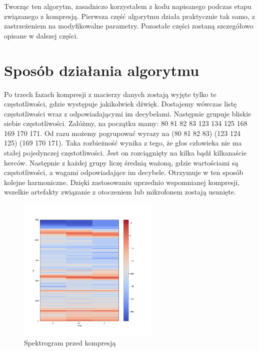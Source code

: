 \documentclass[a4paper,12pt]{extarticle}
\begin{document}
Tworząc ten algorytm, zasadniczo korzystałem z kodu napisanego podczas etapu związanego z kompresją. Pierwsza część algorytmu działa praktycznie tak samo, z zastrzeżeniem na modyfikowalne parametry. Pozostałe części zostaną szczegółowo opisane w dalszej części.

\section*{Sposób działania algorytmu}

Po trzech fazach kompresji \cite{report2} z macierzy danych zostają wyjęte tylko te częstotliwości, gdzie występuje jakikolwiek dźwięk. Dostajemy wówczas listę częstotliwości wraz z odpowiadającymi im decybelami. Następnie grupuje bliskie siebie częstotliwości. Załóżmy, na początku mamy: 80 81 82 83 123 134 125 168 169 170 171. Od razu możemy pogrupować wyrazy na (80 81 82 83) (123 124 125) (169 170 171). Taka rozbieżność wynika z tego, że głos człowieka nie ma stałej pojedynczej częstotliwości. Jest on rozciągnięty na kilka bądź kilkanaście herców. Następnie z każdej grupy liczę średnią ważoną, gdzie wartościami są częstotliwości, a wagami odpowiadające im decybele. Otrzymuje w ten sposób kolejne harmoniczne. Dzięki zastosowaniu uprzednio wspomnianej kompresji, wszelkie artefakty związanie z otoczeniem lub mikrofonem zostają usunięte.

\begin{figure}[h!]
\centering
\includegraphics[width=0.6\textwidth]{przed-kompresja}
\caption{Spektrogram przed kompresją}
\end{figure}
\end{document}
